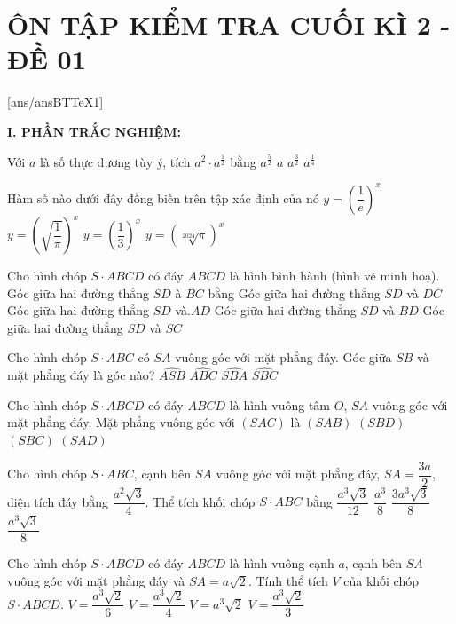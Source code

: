 \section*{ÔN TẬP KIỂM TRA CUỐI KÌ 2 - ĐỀ 01}
\setcounter{ex}{0}\setcounter{bt}{0}
[ans/ansBTTeX1]

\noindent\textbf{I. PHẦN TRẮC NGHIỆM:}
\begin{ex}
Với $a$ là số thực dương tùy ý, tích $a^2 \cdot {a^{\tfrac{1}{2}}}$ bằng
\choice
{${a^{\tfrac{5}{2}}}$}
{$a$}
{${a^{\tfrac{3}{2}}}$}
{${a^{\tfrac{1}{4}}}$}
\end{ex}
\begin{ex}
Hàm số nào dưới đây đồng biến trên tập xác định của nó
\choice
{$y=\left(\dfrac{1}{e}\right)^x$}
{$y={{\left(\sqrt{\dfrac{1}{\pi }}\right)}^x}$}
{$y={{\left(\dfrac{1}{3}\right)}^x}$}
{$y={{\left(\sqrt[2024]{\pi }\right)}^x}$}

\end{ex}
\begin{ex}
Cho hình chóp $S \cdot ABCD$ có đáy $ABCD$ là hình bình hành (hình vẽ minh hoạ). Góc giữa hai đường thẳng $SD$ à $BC$ bằng
\choice
{Góc giữa hai đường thẳng $SD$ và $DC$}
{Góc giữa hai đường thẳng $SD$ và.$AD$}
{Góc giữa hai đường thẳng $SD$ và $BD$}
{Góc giữa hai đường thẳng $SD$ và $SC$}
\end{ex}
\begin{ex}
Cho hình chóp $S \cdot ABC$ có $SA$ vuông góc với mặt phẳng đáy. Góc giữa $SB$ và mặt phẳng đáy là góc nào?
\choice
{$\widehat{ASB}$}
{$\widehat{ABC}$}
{$\widehat{SBA}$}
{$\widehat{SBC}$}
\end{ex}
\begin{ex}
Cho hình chóp $S \cdot ABCD$ có đáy $ABCD$ là hình vuông tâm $O$, $SA$ vuông góc với mặt phẳng đáy. Mặt phẳng vuông góc với $(SAC)$ là
\choice
{$(SAB)$}
{$(SBD)$}
{$(SBC)$}
{$(SAD)$}
\end{ex}
\begin{ex}
Cho hình chóp $S \cdot ABC$, cạnh bên $SA$ vuông góc với mặt phẳng đáy, $SA=\dfrac{3a}{2}$, diện tích đáy bằng $\dfrac{a^2\sqrt{3}}{4}$. Thể tích khối chóp $S \cdot ABC$ bằng
\choice
{$\dfrac{a^3\sqrt{3}}{12}$}
{$\dfrac{a^3}{8}$}
{$\dfrac{3a^3\sqrt{3}}{8}$}
{$\dfrac{a^3\sqrt{3}}{8}$}
\end{ex}
\begin{ex}
Cho hình chóp $S \cdot ABCD$ có đáy $ABCD$ là hình vuông cạnh $a$, cạnh bên $SA$ vuông góc với mặt phẳng đáy và $SA=a\sqrt{2}$. Tính thể tích $V$ của khối chóp $S \cdot ABCD$.
\choice
{$V=\dfrac{a^3\sqrt{2}}{6}$}
{$V=\dfrac{a^3\sqrt{2}}{4}$}
{$V=a^3\sqrt{2}$}
{$V=\dfrac{a^3\sqrt{2}}{3}$}
\end{ex}
